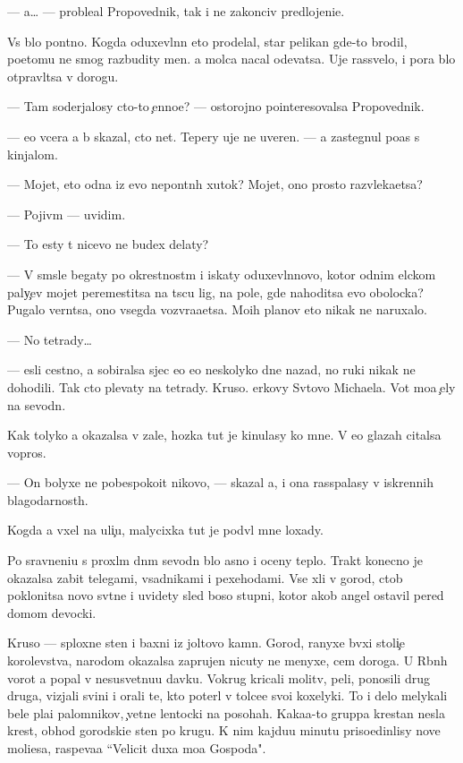 \documentclass[10pt]{book}
\begin{document}
— {\Y}a… — proble{\y}al Propovednik, tak i ne zakonciv predlojeni{\y}e.

Vs{\e} b{\yi}lo pon{\ia}tno. Kogda oduxevl{\e}nn{\yi}{\y} eto prodelal, star{\yi}{\y} pelikan gde-to brodil, poetomu ne smog razbudity men{\ia}. {\Y}a molca nacal odevatsa. Uje rassvelo, i pora b{\yi}lo otpravl{\ia}tsa v dorogu.

— Tam soderjalosy cto-to {\c}enno{\y}e? — ostorojno pointeresovalsa Propovednik.

— {\Y}e{\x}o vcera {\y}a b{\yi} skazal, cto net. Tepery uje ne uveren. — {\Y}a zastegnul po{\y}as s kinjalom.

— Mojet, eto odna iz {\y}evo nepon{\ia}tn{\yi}h xutok? Mojet, ono prosto razvleka{\y}etsa?

— Pojiv{\e}m — uvidim.

— To {\y}esty t{\yi} nicevo ne budex delaty?

— V sm{\yi}sle begaty po okrestnost{\ia}m i iskaty oduxevl{\e}nnovo, kotor{\yi}{\y} odnim {\x}elckom paly{\c}ev mojet peremestitsa na t{\yi}s{\ia}cu lig, na pole, gde nahoditsa {\y}evo obolocka? Pugalo vern{\e}tsa, ono vsegda vozvra{\x}a{\y}etsa. Mo{\y}ih planov eto nikak ne naruxalo.

— No tetrady…

— {\Y}esli cestno, {\y}a sobiralsa sjec {\y}e{\y}o {\y}e{\x}o neskolyko dne{\y} nazad, no ruki nikak ne dohodili. Tak cto plevaty na tetrady. Kruso. {\C}erkovy Sv{\ia}tovo Michaela. Vot mo{\y}a {\c}ely na sevodn{\ia}.

Kak tolyko {\y}a okazalsa v zale, hoz{\ia}{\y}ka tut je kinulasy ko mne. V {\y}e{\y}o glazah citalsa vopros.

— On bolyxe ne pobespoko{\y}it nikovo, — skazal {\y}a, i ona rass{\yi}palasy v iskrennih blagodarnost{\ia}h.

Kogda {\y}a v{\yi}xel na uli{\c}u, malycixka tut je podv{\e}l mne loxady.

Po sravneni{\y}u s proxl{\yi}m dn{\e}m sevodn{\ia} b{\yi}lo {\y}asno i oceny teplo. Trakt konecno je okazalsa zabit telegami, vsadnikami i pexehodami. Vse xli v gorod, ctob{\yi} poklonitsa novo{\y} sv{\ia}t{\yi}ne i uvidety sled boso{\y} stupni, kotor{\yi}{\y} {\y}akob{\yi} angel ostavil pered domom devocki.

Kruso — sploxn{\yi}{\y}e sten{\yi} i baxni iz joltovo kamn{\ia}. Gorod, ranyxe b{\yi}vxi{\y} stoli{\c}e{\y} korolevstva, narodom okazalsa zaprujen nicuty ne menyxe, cem doroga. U R{\yi}bn{\yi}h vorot {\y}a popal v nesusvetnu{\y}u davku. Vokrug kricali molitv{\yi}, peli, ponosili drug druga, vizjali svin{\yf}i i orali te, kto poter{\ia}l v tolce{\y}e svo{\y}i koxelyki. To i delo melykali bel{\yi}{\y}e pla{\x}i palomnikov, {\c}vetn{\yi}{\y}e lentocki na posohah. Kaka{\y}a-to gruppa krest{\y}an nesla krest, obhod{\ia} gorodski{\y}e sten{\yi} po krugu. K nim kajdu{\y}u minutu priso{\y}edin{\ia}lisy nov{\yi}{\y}e mol{\ia}{\x}i{\y}esa, raspeva{\y}a ``Velicit duxa mo{\y}a Gospoda".
\end{document}
